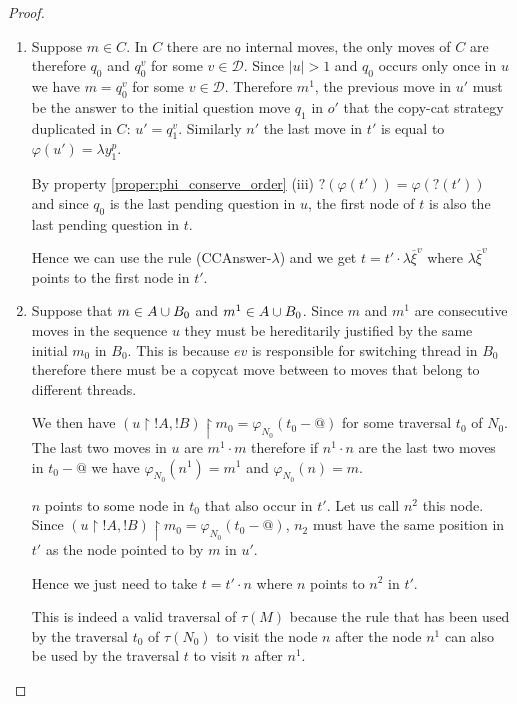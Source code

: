 \begin{proof}
\begin{itemize}
    \begin{enumerate}
    \item Suppose $m \in C$. In $C$ there are no internal moves, the only moves of $C$ are therefore $q_0$ and
    $q_0^v$ for some $v\in\mathcal{D}$. Since $|u|>1$ and $q_0$ occurs only once in $u$ we have $m = q_0^v$
    for some $v\in \mathcal{D}$.  Therefore $m^1$, the previous move in $u'$ must be the answer to the initial question move
    $q_1$ in $o'$ that the copy-cat strategy duplicated in $C$: $u'=q_1^v$. Similarly $n'$ the last move in $t'$ is equal to
    $\varphi(u') = \lambda y_1^p$.

    By property \ref{proper:phi_conserve_order} (iii) $?(\varphi(t')) = \varphi(?(t'))$ and
    since $q_0$ is the last pending question in $u$,
    the first node of $t$ is also the last pending question in $t$.

    Hence we can use the rule (CCAnswer-$\lambda$) and we get $t = t' \cdot \lambda \overline{\xi}^v$
    where $\lambda \overline{\xi}^v$ points to the first node in $t'$.

    \item Suppose that $m \in A \cup B_0$ and $m^1 \in A \cup B_0$.
    Since $m$ and $m^1$ are consecutive moves in the sequence $u$ they must be hereditarily justified by the same initial
    $m_0$ in $B_0$. This is because $ev$ is responsible for switching thread in $B_0$ therefore there must be a copycat
    move between to moves that belong to different threads.

    We then have $(u \upharpoonright !A, !B)\upharpoonright m_0 = \varphi_{N_0}(t_0-@)$ for some traversal $t_0$ of $N_0$.
    The last two moves in $u$ are $m^1 \cdot m$ therefore
    if $n^1 \cdot n$ are the last two moves in $t_0-@$ we have
    $\varphi_{N_0}(n^1) = m^1$ and $\varphi_{N_0}(n) = m$.

    $n$ points to some node in $t_0$ that also occur in $t'$. Let us call $n^2$ this node.
    Since $(u \upharpoonright !A, !B)\upharpoonright m_0 = \varphi_{N_0}(t_0-@)$,
    $n_2$ must have the same position in $t'$ as the node pointed to by $m$ in $u'$.

    Hence we just need to take $t = t' \cdot n$ where $n$ points to $n^2$ in $t'$.

    This is indeed a valid traversal of $\tau(M)$
    because the rule that has been used by the traversal $t_0$
    of $\tau(N_0)$ to visit the node $n$ after the node $n^1$ can also be used by the traversal $t$ to visit $n$ after $n^1$.


\end{enumerate}
\end{itemize}
\end{proof}
